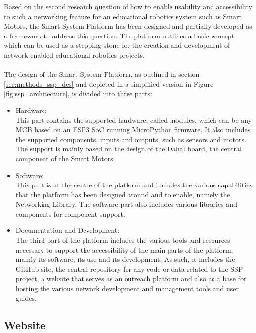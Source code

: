 Based on the second research question of how to enable usability and accessibility to such a networking feature for an educational robotics system such as Smart Motors, the Smart System Platform has been designed and partially developed as a framework to address this question. The platform outlines a basic concept which can be used as a stepping stone for the creation and development of network-enabled educational robotics projects. \\\\
The design of the Smart System Platform, as outlined in section \ref{sec:methods_ssp_des} and depicted in a simplified version in Figure \ref{fig:ssp_architecture}, is divided into three parts:
\begin{itemize}
    \item Hardware:\\
    This part contains the supported hardware, called modules, which can be any MCB based on an ESP3 SoC running MicroPython firmware. It also includes the supported components, inputs and outputs, such as sensors and motors. The support is mainly based on the design of the Dahal board, the central component of the Smart Motors. 
    \item Software:\\
    This part is at the centre of the platform and includes the various capabilities that the platform has been designed around and to enable, namely the Networking Library. The software part also includes various libraries and components for component support. 
    \item Documentation and Development:\\
    The third part of the platform includes the various tools and resources necessary to support the accessibility of the main parts of the platform, mainly its software, its use and its development. As such, it includes the GitHub site, the central repository for any code or data related to the SSP project, a website that serves as an outreach platform and also as a base for hosting the various network development and management tools and user guides.
\end{itemize}


\subsection{\label{sec:res_website}Website}

